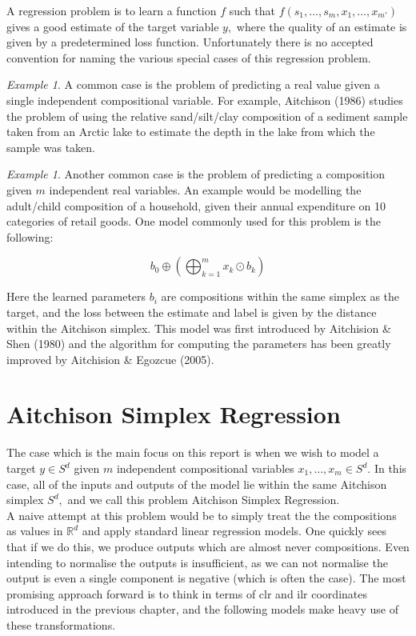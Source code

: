 \documentclass[BSc]{usydthesis}
\numberwithin{equation}{chapter}
\theoremstyle{remark}
\newtheorem{Example}[equation]{Example}
\begin{document}
A regression problem is to learn a function $f$ such that $f(s_1,\ldots, s_m, x_1, \ldots, x_{m'})$ gives a good estimate of the target variable $y,$ where the quality of an estimate is given by a predetermined loss function. Unfortunately there is no accepted convention for naming the various special cases of this regression problem.

\begin{Example}
 A common case is the problem of predicting a real value given a single independent compositional variable. For example, Aitchison (1986) studies the problem of using the relative sand/silt/clay composition of a sediment sample taken from an Arctic lake to estimate the depth in the lake from which the sample was taken. 
\end{Example}

\begin{Example}
 Another common case is the problem of predicting a composition given $m$ independent real variables. An example would be modelling the adult/child composition of a household, given their annual expenditure on 10 categories of retail goods. One model commonly used for this problem is the following:
 
 $$ b_0 \oplus \left( \bigoplus_{k=1}^m x_k \odot b_k \right)$$
 
 Here the learned parameters $b_i$ are compositions within the same simplex as the target, and the loss between the estimate and label is given by the distance within the Aitchison simplex. This model was first introduced by Aitchision \& Shen (1980) and the algorithm for computing the parameters has been greatly improved by Aitchision \& Egozcue (2005).
\end{Example}




\section{Aitchison Simplex Regression}

The case which is the main focus on this report is when we wish to model a target $y \in S^d$ given $m$ independent compositional variables $x_1,\ldots, x_m \in S^d.$ In this case, all of the inputs and outputs of the model lie within the same Aitchison simplex $S^d,$ and we call this problem Aitchison Simplex Regression. \\

A naive attempt at this problem would be to simply treat the the compositions as values in $\mathbb{R}^d$ and apply standard linear regression models. One quickly sees that if we do this, we produce outputs which are almost never compositions. Even intending to normalise the outputs is insufficient, as we can not normalise the output is even a single component is negative (which is often the case). The most promising approach forward is to think in terms of clr and ilr coordinates introduced in the previous chapter, and the following models make heavy use of these transformations.
\end{document}
